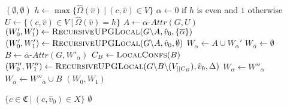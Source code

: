 \begin{algorithm}
	\caption{$\textsc{RecursiveUPGLocal}(\textit{parity game } G = (\\
		V \subseteq \mathfrak{C} \times \hat{V},\\
		\hat{V}_0 \subseteq \hat{V},\\
		\hat{V}_1 \subseteq \hat{V},\\
		E \subseteq (\mathfrak{C} \times \hat{V}) \times (\mathfrak{C} \times \hat{V}),\\
		\hat{\Omega} : \hat{V} \rightarrow \mathbb{N}),\\
		\hat{v}_0 \in \hat{V},\\
		\Delta \subseteq \{ 0,1\})$}
	\label{alg_zlnk_collective_local}
	\begin{multicols}{2}
		\begin{algorithmic}[1]
			\State \Return $(\emptyset,\emptyset)$
			\EndIf
			\State $h \gets\max\{ \hat{\Omega}(\hat{v})\ |\ (c,\hat{v}) \in V\}$
			\State $\alpha \gets 0$ if $h$ is even and $1$ otherwise
			\State $U \gets \{(c,\hat{v}) \in V\ |\ \hat{\Omega}(\hat{v}) = h\}$
			\State $A \gets \alpha\textit{-Attr}(G, U)$
			\If{$\overline{\alpha} \in \Delta$}
			\State $(W_0', W_1') \gets \textsc{RecursiveUPGLocal}(G \backslash A,\hat{v}_0,\{\overline{\alpha}\})$
			\Else
			\State $(W_0', W_1') \gets \textsc{RecursiveUPGLocal}(G \backslash A,\hat{v}_0,\emptyset)$
			\EndIf
			\label{line:recursiveUPGLocal:wopponentisempty}
			\State $W_\alpha \gets A \cup W_\alpha'$
			\State $W_{\overline{\alpha}} \gets \emptyset$
			\Else
				\State $B \gets \overline{\alpha}\textit{-Attr}(G, W'_{\overline{\alpha}})$\label{line:recursiveUPGLocal:calcB}
				\State $C_B \gets \textsc{LocalConfs}(B)$\label{line:recursiveUPGLocal:calcC_B}
				\State $(W_0'', W_1'') \gets \textsc{RecursiveUPGLocal}(G \backslash B\backslash (V_{||C_B}), \hat{v}_0, \Delta)$\label{line:recursiveUPGLocal:subgame2}
				\State $W_\alpha \gets W''_\alpha$
				\State $W_{\overline{\alpha}} \gets W''_{\overline{\alpha}} \cup B$
			\EndIf
			\State \Return $(W_0, W_1)$
		\end{algorithmic}\bigskip\bigskip\bigskip\bigskip\bigskip\bigskip\bigskip\bigskip\bigskip\bigskip\bigskip\bigskip\bigskip\bigskip\bigskip\bigskip\bigskip\bigskip\bigskip\bigskip\bigskip\bigskip\bigskip\bigskip\bigskip\bigskip
		\begin{algorithmic}[1]
			\If{$\overline{\alpha} \in \Delta$}
				\State \Return $\{ c \in \mathfrak{C}\ |\ (c, \hat{v}_0) \in X \}$
			\Else
				\State \Return $\emptyset$
			\EndIf
			\EndFunction
		\end{algorithmic}
	\end{multicols}
\end{algorithm}

